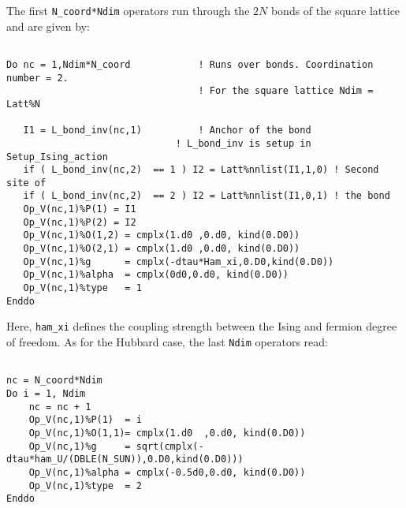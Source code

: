 \documentclass{SciPost}
\begin{document}
The  first  \texttt{N\_coord*Ndim} operators run through the $2N$ bonds of the square lattice and   are given by:
\begin{lstlisting}

Do nc = 1,Ndim*N_coord            ! Runs over bonds. Coordination number = 2.
                                  ! For the square lattice Ndim = Latt%N
  
   I1 = L_bond_inv(nc,1)          ! Anchor of the bond
	                          ! L_bond_inv is setup in Setup_Ising_action
   if ( L_bond_inv(nc,2)  == 1 ) I2 = Latt%nnlist(I1,1,0) ! Second site of
   if ( L_bond_inv(nc,2)  == 2 ) I2 = Latt%nnlist(I1,0,1) ! the bond  
   Op_V(nc,1)%P(1) = I1
   Op_V(nc,1)%P(2) = I2
   Op_V(nc,1)%O(1,2) = cmplx(1.d0 ,0.d0, kind(0.D0))
   Op_V(nc,1)%O(2,1) = cmplx(1.d0 ,0.d0, kind(0.D0))
   Op_V(nc,1)%g      = cmplx(-dtau*Ham_xi,0.D0,kind(0.D0))
   Op_V(nc,1)%alpha  = cmplx(0d0,0.d0, kind(0.D0))
   Op_V(nc,1)%type   = 1
Enddo

\end{lstlisting}
Here,  \texttt{ham\_xi} defines the coupling strength  between the Ising  and fermion degree of freedom.
As for the Hubbard case, the last \texttt{Ndim}  operators read: 

\begin{lstlisting}

nc = N_coord*Ndim 
Do i = 1, Ndim
    nc = nc + 1
    Op_V(nc,1)%P(1)  = i 
    Op_V(nc,1)%O(1,1)= cmplx(1.d0  ,0.d0, kind(0.D0))
    Op_V(nc,1)%g     = sqrt(cmplx(-dtau*ham_U/(DBLE(N_SUN)),0.D0,kind(0.D0)))
    Op_V(nc,1)%alpha = cmplx(-0.5d0,0.d0, kind(0.D0))
    Op_V(nc,1)%type  = 2
Enddo

\end{lstlisting}
%
\end{document}

